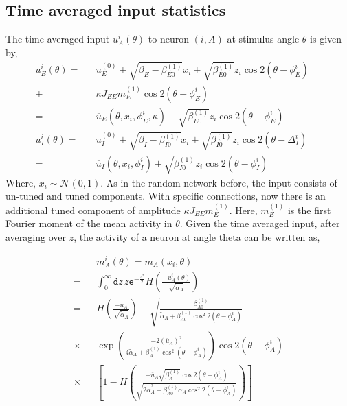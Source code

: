 \subsection{Time averaged input statistics}
The time averaged input $u_A^{i} (\theta)$ to neuron $(i, A)$ at stimulus angle $\theta$ is given by, 
\begin{eqnarray}
\label{ueOfTheta}
u_E^{i} (\theta) =&& u^{(0)}_E + \sqrt{\beta_E - \beta_{E0}^{(1)}} x_i +  \sqrt{\beta_{E0}^{(1)}} z_i \cos 2 (\theta - \phi_E^i) \,\,\,\, \,\,\,\,\nonumber \\
+&& \kappa J_{EE} m_E^{(1)} \cos 2 ( \theta  - \phi_E^i) \\
=&& \overline{u}_E(\theta, x_i, \phi_E^i, \kappa) +  \sqrt{\beta_{E0}^{(1)}} z_i \cos 2 (\theta - \phi_E^i) \\
u_I^{i} (\theta) =&& u^{(0)}_I + \sqrt{\beta_I - \beta_{I0}^{(1)}} x_i +  \sqrt{\beta_{I0}^{(1)}} z_i \cos 2 (\theta - \Delta_I^i) \\
=&& \overline{u}_I(\theta, x_i, \phi_I^i) +  \sqrt{\beta_{I0}^{(1)}} z_i \cos 2 (\theta - \phi_I^i)
\end{eqnarray}
Where, $x_i \sim \mathcal{N}(0, 1)$.  As in the random network before, the input consists of un-tuned and tuned components. With specific connections, now there is an additional tuned component of amplitude  $\kappa J_{EE} m_E^{(1)}$. Here, $m_E^{(1)}$ is the first Fourier moment of the mean activity in $\theta$. 
Given the time averaged input, after averaging over $z$, the activity of a neuron at angle theta can be written as, 

\begin{eqnarray}
&&m_A^i(\theta) = m_A(x_i, \theta) \nonumber \\
=&& \int_{0}^{\infty} \mathtt{d} z\,  z \mathtt{e}^{-\frac{z^2}{2}} H\left( \frac{-u_A^i(\theta)}{\sqrt{\tilde{\alpha}_A }} \right)  \\
=&& H\left( \frac{-\overline{u}_A }{\sqrt{\tilde{\alpha}_A }}  \right) + \sqrt{\frac{\beta_{A0}^{(1)} }{  \tilde{\alpha}_A + \beta_{A0}^{(1)} \cos^2 2 (\theta - \phi_A^i) }} \nonumber \\ 
\times&&  \exp \left( \frac{-2 \left( \overline{u}_A \right)^2  }{ 4 \tilde{\alpha}_A + \beta_A^{(1)} \cos^2  (\theta - \phi_A^i)}   \right) \cos2(\theta - \phi_A^i) \nonumber \\
\times&& \left[ 1 - H \left( \frac{- \overline{u}_A \sqrt{\beta_A^{(1)} } \cos 2 (\theta - \phi_A^i) } {  \sqrt{2 \tilde{\alpha}^2_A + \beta_{A0}^{(1)} \tilde{\alpha}_A \cos^2 2 (\theta - \phi_A^i) }} \right) \right]  \label{mAiofTheta} 
\end{eqnarray}

